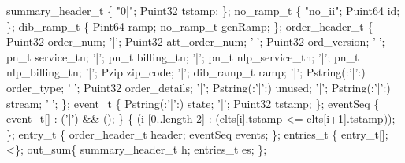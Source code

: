 \begin{code}
  summary\_header\_t \{  "0|";  Puint32 tstamp; \};
\mbox{}
 no\_ramp\_t \{ "no\_ii";  Puint64 id; \};
\mbox{}
 dib\_ramp\_t \{
  Pint64     ramp;
  no\_ramp\_t  genRamp;
\};
\mbox{}
 order\_header\_t \{
       Puint32             order\_num;
 '|';  Puint32             att\_order\_num;
 '|';  Puint32             ord\_version;
 '|';   pn\_t           service\_tn;
 '|';   pn\_t           billing\_tn;
 '|';   pn\_t           nlp\_service\_tn;
 '|';   pn\_t           nlp\_billing\_tn;
 '|';   Pzip           zip\_code;
 '|';  dib\_ramp\_t          ramp;
 '|';  Pstring(:'|':)      order\_type;
 '|';  Puint32             order\_details;
 '|';  Pstring(:'|':)      unused;
 '|';  Pstring(:'|':)      stream;
 '|';
\};
\mbox{}
 event\_t \{
  Pstring(:'|':) state;   '|';
  Puint32        tstamp;
\};
\mbox{}
 eventSeq \{
  event\_t[] : ('|') && ();
\}  \{
   (i  [0..length-2] : (elts[i].tstamp <= elts[i+1].tstamp));
\};
\mbox{}
  entry\_t \{
  order\_header\_t  header;
  eventSeq        events;
\};
\mbox{}
 entries\_t \{  entry\_t[]; <\};
\mbox{}
  out\_sum\{
  summary\_header\_t  h;
  entries\_t         es;
\};
\end{code}

